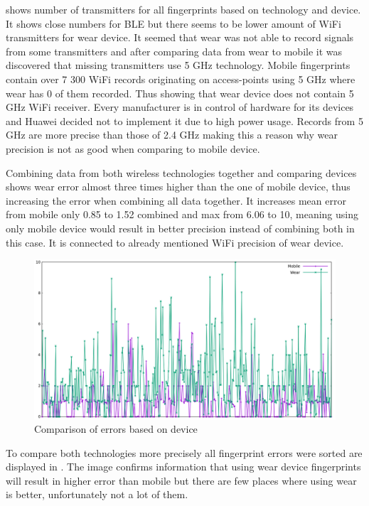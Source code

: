  shows number of transmitters for all fingerprints based on technology and device. It shows close numbers for BLE but there seems to be lower amount of WiFi transmitters for wear device. It seemed that wear was not able to record signals from some transmitters and after comparing data from wear to mobile it was discovered that missing transmitters use 5 GHz technology. Mobile fingerprints contain over 7 300 WiFi records originating on access-points using 5 GHz where wear has 0 of them recorded. Thus showing that wear device does not contain 5 GHz WiFi receiver. Every manufacturer is in control of hardware for its devices and Huawei decided not to implement it due to high power usage. Records from 5 GHz are more precise than those of 2.4 GHz making this a reason why wear precision is not as good when comparing to mobile device.

Combining data from both wireless technologies together and comparing devices shows wear error almost three times higher than the one of mobile device, thus increasing the error when combining all data together. It increases mean error from mobile only 0.85 to 1.52 combined and max from 6.06 to 10, meaning using only mobile device would result in better precision instead of combining both in this case. It is connected to already mentioned WiFi precision of wear device.

\begin{figure}[h!]
	\begin{centering}
		\includegraphics[width=1\textwidth]{img/wknn_errors_mobile_phone}
		\par\end{centering}
	\caption{Comparison of errors based on device}
	\label{fig06c06}
\end{figure}

To compare both technologies more precisely all fingerprint errors were sorted are displayed in . The image confirms information that using wear device fingerprints will result in higher error than mobile but there are few places where using wear is better, unfortunately not a lot of them. 

